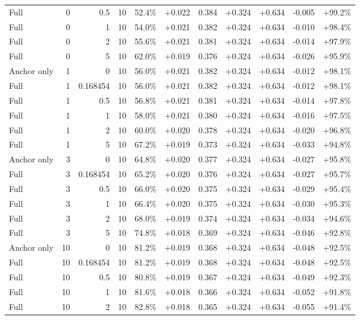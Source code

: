 \begin{table}[htbp]
\begin{tabular}{lrrrccccccc}
Full & 0 & 0.5 & 10 & 52.4\% & +0.022 & 0.384 & +0.324 & +0.634 & -0.005 & +99.2\% \\
Full & 0 & 1 & 10 & 54.0\% & +0.021 & 0.382 & +0.324 & +0.634 & -0.010 & +98.4\% \\
Full & 0 & 2 & 10 & 55.6\% & +0.021 & 0.381 & +0.324 & +0.634 & -0.014 & +97.9\% \\
Full & 0 & 5 & 10 & 62.0\% & +0.019 & 0.376 & +0.324 & +0.634 & -0.026 & +95.9\% \\
Anchor only & 1 & 0 & 10 & 56.0\% & +0.021 & 0.382 & +0.324 & +0.634 & -0.012 & +98.1\% \\
Full & 1 & 0.168454 & 10 & 56.0\% & +0.021 & 0.382 & +0.324 & +0.634 & -0.012 & +98.1\% \\
Full & 1 & 0.5 & 10 & 56.8\% & +0.021 & 0.381 & +0.324 & +0.634 & -0.014 & +97.8\% \\
Full & 1 & 1 & 10 & 58.0\% & +0.021 & 0.380 & +0.324 & +0.634 & -0.016 & +97.5\% \\
Full & 1 & 2 & 10 & 60.0\% & +0.020 & 0.378 & +0.324 & +0.634 & -0.020 & +96.8\% \\
Full & 1 & 5 & 10 & 67.2\% & +0.019 & 0.373 & +0.324 & +0.634 & -0.033 & +94.8\% \\
Anchor only & 3 & 0 & 10 & 64.8\% & +0.020 & 0.377 & +0.324 & +0.634 & -0.027 & +95.8\% \\
Full & 3 & 0.168454 & 10 & 65.2\% & +0.020 & 0.376 & +0.324 & +0.634 & -0.027 & +95.7\% \\
Full & 3 & 0.5 & 10 & 66.0\% & +0.020 & 0.375 & +0.324 & +0.634 & -0.029 & +95.4\% \\
Full & 3 & 1 & 10 & 66.4\% & +0.020 & 0.375 & +0.324 & +0.634 & -0.030 & +95.3\% \\
Full & 3 & 2 & 10 & 68.0\% & +0.019 & 0.374 & +0.324 & +0.634 & -0.034 & +94.6\% \\
Full & 3 & 5 & 10 & 74.8\% & +0.018 & 0.369 & +0.324 & +0.634 & -0.046 & +92.8\% \\
Anchor only & 10 & 0 & 10 & 81.2\% & +0.019 & 0.368 & +0.324 & +0.634 & -0.048 & +92.5\% \\
Full & 10 & 0.168454 & 10 & 81.2\% & +0.019 & 0.368 & +0.324 & +0.634 & -0.048 & +92.5\% \\
Full & 10 & 0.5 & 10 & 80.8\% & +0.019 & 0.367 & +0.324 & +0.634 & -0.049 & +92.3\% \\
Full & 10 & 1 & 10 & 81.6\% & +0.018 & 0.366 & +0.324 & +0.634 & -0.052 & +91.8\% \\
Full & 10 & 2 & 10 & 82.8\% & +0.018 & 0.365 & +0.324 & +0.634 & -0.055 & +91.4\% \\

\end{tabular}
\end{table}
